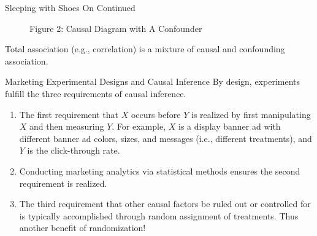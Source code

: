 \documentclass[pdf]{beamer}
\theoremstyle{remark}
\theoremstyle{definition}
\begin{document}
\begin{frame}[t]{Sleeping with Shoes On Continued}
\begin{figure}[h]
\begin{center}
\captionsetup{justification=centering}
\caption{Figure {\color{franklinblue} 2}: Causal Diagram with A Confounder}
\label{fig:Drink}
\end{center}
\end{figure}
Total association (e.g., correlation) is a mixture of causal and confounding association.
\end{frame}

\begin{frame}[t]{Marketing Experimental Designs and Causal Inference}
By design, experiments fulfill the three requirements of causal inference.
\begin{enumerate}
\item The first requirement that $X$ occurs before $Y$ is realized by first manipulating $X$ and then measuring $Y$. For example, $X$ is a display banner ad with different banner ad colors, sizes, and messages (i.e., different treatments), and $Y$ is the click-through rate.
\item Conducting marketing analytics via statistical methods ensures the second requirement is realized.  
\item  The third requirement that other causal factors be ruled out or controlled for is typically accomplished through random assignment of treatments.  Thus another benefit of randomization! 
\end{enumerate}
\end{frame}
\end{document}
